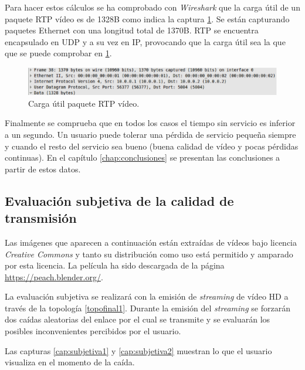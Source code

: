 \documentclass[a4paper,11pt]{book}
\begin{document}
Para hacer estos cálculos se ha comprobado con \emph{Wireshark} que la carga útil de un paquete \ac{RTP} vídeo es de 1328B como indica la captura \ref{cap:wiresharkCarga}. Se están capturando paquetes Ethernet con una longitud total de 1370B. \ac{RTP} se encuentra encapsulado en \ac{UDP} y a su vez en \ac{IP}, provocando que la carga útil sea la que que se puede comprobar en \ref{cap:wiresharkCarga}.

\begin{figure}[tb]
\centering
\includegraphics[scale=0.5]{./figuras/wiresharkCarga}
\caption{Carga útil paquete \ac{RTP} vídeo.}
\label{cap:wiresharkCarga}
\end{figure}

Finalmente se comprueba que en todos los casos el tiempo sin servicio es inferior a un segundo. Un usuario puede tolerar una pérdida de servicio pequeña siempre y cuando el resto del servicio sea bueno (buena calidad de vídeo y pocas pérdidas continuas). En el capítulo \ref{chap:conclusiones} se presentan las conclusiones a partir de estos datos.

\subsection{Evaluación subjetiva de la calidad de transmisión}

Las imágenes que aparecen a continuación están extraídas de vídeos bajo licencia \textit{Creative Commons} y tanto su distribución como uso está permitido y amparado por esta licencia. La película ha sido descargada de la página \url{https://peach.blender.org/}.

La evaluación subjetiva se realizará con la emisión de \textit{streaming} de vídeo \ac{HD} a través de la topología \ref{topofinal1}. Durante la emisión del \textit{streaming} se forzarán dos caídas aleatorias del enlace por el cual se transmite y se evaluarán los posibles inconvenientes percibidos por el usuario.

Las capturas \ref{cap:subjetiva1} y \ref{cap:subjetiva2} muestran lo que el usuario visualiza en el momento de la caída.
\end{document}
